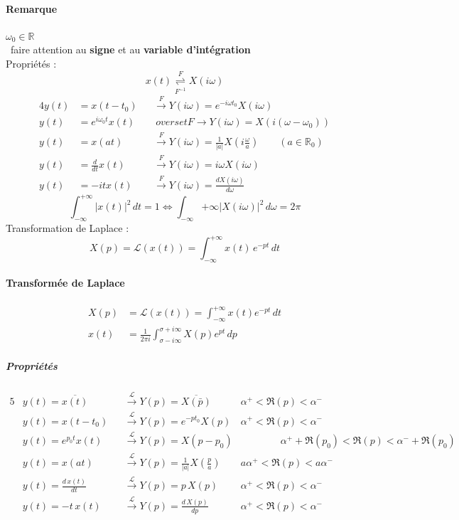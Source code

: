 \paragraph{Remarque} $\omega_0\in\mathbb{R}$\\ \danger\ faire attention au \textbf{signe} et au \textbf{variable d'intégration}\\
Propriétés : 
$$x(t)\overset{F}{\underset{F^{-1}}{\rightleftharpoons}}X(i\omega)$$
\begin{alignat*}{4}
y(t) &= x(t-t_0) &&\overset{F}{\rightarrow} Y(i\omega)=e^{-i\omega t_0}X(i\omega)\\
y(t) &= e^{i\omega_0t}x(t) &&\
overset{F}{\rightarrow} Y(i\omega)=X(i(\omega-\omega_0))\\ 
y(t) &= x(at) &&\overset{F}{\rightarrow} Y(i\omega)=\frac{1}{|a|}X\left(i\frac{\omega}{a}\right)\qquad (a\in\mathbb{R}_0)\\
y(t) &= \frac{d}{dt}x(t) &&\overset{F}{\rightarrow} Y(i\omega)=i\omega X(i\omega)\\
y(t) &= -itx(t) &&\overset{F}{\rightarrow} Y(i\omega)=\frac{dX(i\omega)}{d\omega}
\end{alignat*}
$$\int_{-\infty}^{+\infty}|x(t)|^2\,dt=1\Leftrightarrow\int_{-\infty}{+\infty}|X(i\omega)|^2\,d\omega=2\pi $$
Transformation de Laplace : 
$$X(p)=\mathcal{L}(x(t))=\int_{-\infty}^{+\infty}x(t)\,e^{-pt}\,dt $$

\paragraph{Transformée de Laplace} \begin{align*}X(p) &=\mathcal{L}(x(t))=\int_{-\infty}^ {+\infty}x(t)e^ {-pt}\,dt\\
x(t) &= \frac{1}{2\pi i}\int_{\sigma-i\infty}^ {\sigma+i\infty}X(p)e^{pt}\,dp
\end{align*}
\subparagraph{Propriétés} \begin{alignat*}{5}
& y(t)=\overline{x(t)} &&\overset{\mathcal{L}}{\rightarrow} Y(p)=\overline{X(\bar{p})} & \alpha^+<\Re(p)<\alpha^-\\
& y(t)=x(t-t_0) &&\overset{\mathcal{L}}{\rightarrow} Y(p)=e^{-pt_0}X(p) & \alpha^+<\Re(p)<\alpha^- \\
& y(t)=e^{p_0t}x(t) &&\overset{\mathcal{L}}{\rightarrow} Y(p)= X(p-p_0) & \qquad\qquad\alpha^++\Re(p_0)<\Re(p)<\alpha^-+\Re(p_0)\\
& y(t)=x(at) &&\overset{\mathcal{L}}{\rightarrow} Y(p) = \frac{1}{|a|}X\left(\frac{p}{a}\right) & a\alpha^+<\Re(p)<a\alpha^-\\
& y(t)=\frac{d\,x(t)}{dt} &&\overset{\mathcal{L}}{\rightarrow} Y(p) =p\,X(p) & \alpha^+<\Re(p)<\alpha^-\\
& y(t)=-t\,x(t) &&\overset{\mathcal{L}}{\rightarrow}  Y(p)=\frac{d\,X(p)}{dp} & \alpha^+<\Re(p)<\alpha^-\\
\end{alignat*}
